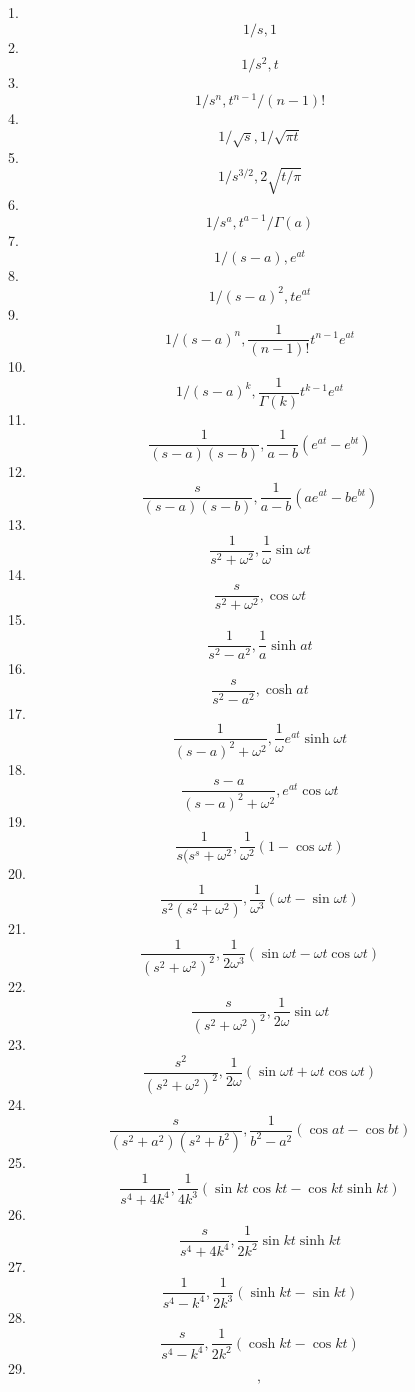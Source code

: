  1. \[ 1/s , 1 \]
 2. \[ 1/s^2 , t \]
 3. \[ 1/s^n , t^{n-1}/(n-1)! \]
 4. \[ 1/\sqrt{s} , 1/\sqrt{\pi t} \]
 5. \[ 1/s^{3/2} , 2\sqrt{t/\pi} \]
 6. \[ 1/s^a  , t^{a-1}/\Gamma(a) \]
 7. \[ 1/(s-a) , e^{at} \]
 8. \[ 1/(s-a)^2 , te^{at} \]
 9. \[ 1/(s-a)^n , \frac{1}{(n-1)!}t^{n-1}e^{at} \]
10. \[ 1/(s-a)^k , \frac{1}{\Gamma(k)}t^{k-1}e^{at} \]
11. \[ \frac{1}{(s-a)(s-b)} , \frac{1}{a-b}(e^{at}-e^{bt}) \]
12. \[ \frac{s}{(s-a)(s-b)} , \frac{1}{a-b}(ae^{at}-be^{bt}) \]
13. \[ \frac{1}{s^2+\omega^2} , \frac{1}{\omega}\sin \omega t \]
14. \[ \frac{s}{s^2+\omega^2} , \cos \omega t\]
15. \[ \frac{1}{s^2-a^2} , \frac{1}{a}\sinh at \]
16. \[ \frac{s}{s^2-a^2} , \cosh at \]
17. \[ \frac{1}{(s-a)^2+\omega^2} , \frac{1}{\omega} e^{at}\sinh \omega t \]
18. \[ \frac{s-a}{(s-a)^2 + \omega^2} , e^{at}\cos \omega t \]
19. \[ \frac{1}{s(s^s+\omega^2} , \frac{1}{\omega^2}(1-\cos \omega t)  \]
20. \[ \frac{1}{s^2(s^2+\omega^2)} , \frac{1}{\omega^3}(\omega t - \sin \omega t) \]
21. \[ \frac{1}{(s^2+\omega^2)^2} , \frac{1}{2\omega^3}(\sin \omega t - \omega t \cos \omega t) \]
22. \[ \frac{s}{(s^2+\omega^2)^2} , \frac{1}{2\omega}\sin \omega t \]
23. \[ \frac{s^2}{(s^2+\omega^2)^2} , \frac{1}{2\omega}(\sin \omega t+\omega t\cos\omega t) \]
24. \[ \frac{s}{(s^2+a^2)(s^2+b^2)} , \frac{1}{b^2-a^2}(\cos at-\cos bt) \]
25. \[ \frac{1}{s^4 + 4k^4} , \frac{1}{4k^3}(\sin kt\cos kt - \cos kt\sinh kt) \]
26. \[ \frac{s}{s^4+4k^4} , \frac{1}{2k^2} \sin kt\sinh kt \]
27. \[ \frac{1}{s^4-k^4} , \frac{1}{2k^3}(\sinh kt-\sin kt) \]
28. \[ \frac{s}{s^4-k^4} , \frac{1}{2k^2}(\cosh kt-\cos kt) \]
29. \[ , \]